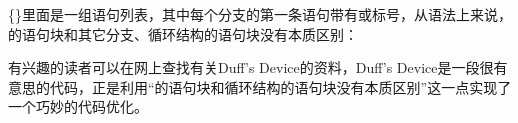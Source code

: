 \begin{BookLiteral}
\BookLiteralLine{\}}
\end{BookLiteral}


\{\}里面是一组语句列表，其中每个分支的第一条语句带有或标号，从语法上来说，的语句块和其它分支、循环结构的语句块没有本质区别：


\begin{BookLiteral}
\end{BookLiteral}


有兴趣的读者可以在网上查找有关Duff's Device的资料，Duff's Device是一段很有意思的代码，正是利用“的语句块和循环结构的语句块没有本质区别”这一点实现了一个巧妙的代码优化。

